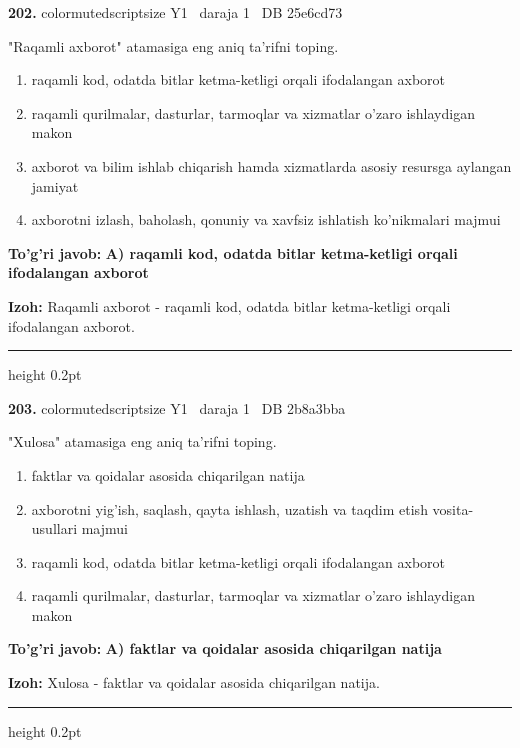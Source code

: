 \documentclass[10pt,a4paper,oneside]{article}
\begin{document}
\noindent\textbf{\color{ink}202.}  {color{muted}scriptsize Y1 \textbullet\ daraja 1 \textbullet\ DB 25e6cd73}
\par
"Raqamli axborot" atamasiga eng aniq ta'rifni toping.
\begin{enumerate}[label=\Alph*),leftmargin=9mm]
\item raqamli kod, odatda bitlar ketma-ketligi orqali ifodalangan axborot
\item raqamli qurilmalar, dasturlar, tarmoqlar va xizmatlar o'zaro ishlaydigan makon
\item axborot va bilim ishlab chiqarish hamda xizmatlarda asosiy resursga aylangan jamiyat
\item axborotni izlash, baholash, qonuniy va xavfsiz ishlatish ko'nikmalari majmui
\end{enumerate}
\begin{tcolorbox}[enhanced,breakable,colback=teal!4,colframe=teal!50!black,boxrule=0.5pt,arc=1.1mm,left=3mm,right=3mm,top=1.7mm,bottom=1.7mm,before skip=2mm,after skip=2mm]
\textbf{\color{teal}To'g'ri javob:} \textbf{A) raqamli kod, odatda bitlar ketma-ketligi orqali ifodalangan axborot}
\par\smallskip
\textbf{Izoh:} Raqamli axborot - raqamli kod, odatda bitlar ketma-ketligi orqali ifodalangan axborot.
\end{tcolorbox}
\vspace{2mm}\hrule height 0.2pt \vspace{3mm}

\noindent\textbf{\color{ink}203.}  {color{muted}scriptsize Y1 \textbullet\ daraja 1 \textbullet\ DB 2b8a3bba}
\par
"Xulosa" atamasiga eng aniq ta'rifni toping.
\begin{enumerate}[label=\Alph*),leftmargin=9mm]
\item faktlar va qoidalar asosida chiqarilgan natija
\item axborotni yig'ish, saqlash, qayta ishlash, uzatish va taqdim etish vosita-usullari majmui
\item raqamli kod, odatda bitlar ketma-ketligi orqali ifodalangan axborot
\item raqamli qurilmalar, dasturlar, tarmoqlar va xizmatlar o'zaro ishlaydigan makon
\end{enumerate}
\begin{tcolorbox}[enhanced,breakable,colback=teal!4,colframe=teal!50!black,boxrule=0.5pt,arc=1.1mm,left=3mm,right=3mm,top=1.7mm,bottom=1.7mm,before skip=2mm,after skip=2mm]
\textbf{\color{teal}To'g'ri javob:} \textbf{A) faktlar va qoidalar asosida chiqarilgan natija}
\par\smallskip
\textbf{Izoh:} Xulosa - faktlar va qoidalar asosida chiqarilgan natija.
\end{tcolorbox}
\vspace{2mm}\hrule height 0.2pt \vspace{3mm}
\end{document}
